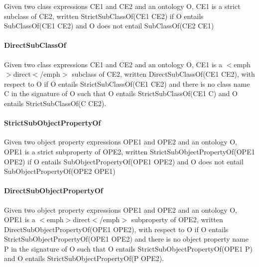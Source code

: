 Given two class expressions {\ttfamily C\-E1} and {\ttfamily C\-E2} and an ontology {\ttfamily O}, {\ttfamily C\-E1} is a strict subclass of {\ttfamily C\-E2}, written {\ttfamily Strict\-Sub\-Class\-Of(\-C\-E1 C\-E2)} if {\ttfamily O} entails {\ttfamily Sub\-Class\-Of(\-C\-E1 C\-E2)} and {\ttfamily O} does not entail {\ttfamily Sub\-Class\-Of(\-C\-E2 C\-E1)} 

\paragraph*{Direct\-Sub\-Class\-Of}

Given two class expressions {\ttfamily C\-E1} and {\ttfamily C\-E2} and an ontology {\ttfamily O}, {\ttfamily C\-E1} is a $<$emph$>$direct$<$/emph$>$ subclass of {\ttfamily C\-E2}, written {\ttfamily Direct\-Sub\-Class\-Of(\-C\-E1 C\-E2)}, with respect to {\ttfamily O} if {\ttfamily O} entails {\ttfamily Strict\-Sub\-Class\-Of(\-C\-E1 C\-E2)} and there is no class name {\ttfamily C} in the signature of {\ttfamily O} such that {\ttfamily O} entails {\ttfamily Strict\-Sub\-Class\-Of(\-C\-E1 C)} and {\ttfamily O} entails {\ttfamily Strict\-Sub\-Class\-Of(\-C C\-E2)}. 

\paragraph*{Strict\-Sub\-Object\-Property\-Of}

Given two object property expressions {\ttfamily O\-P\-E1} and {\ttfamily O\-P\-E2} and an ontology {\ttfamily O}, {\ttfamily O\-P\-E1} is a strict subproperty of {\ttfamily O\-P\-E2}, written {\ttfamily Strict\-Sub\-Object\-Property\-Of(\-O\-P\-E1 O\-P\-E2)} if {\ttfamily O} entails {\ttfamily Sub\-Object\-Property\-Of(\-O\-P\-E1 O\-P\-E2)} and {\ttfamily O} does not entail {\ttfamily Sub\-Object\-Property\-Of(\-O\-P\-E2 O\-P\-E1)} 

\paragraph*{Direct\-Sub\-Object\-Property\-Of}

Given two object property expressions {\ttfamily O\-P\-E1} and {\ttfamily O\-P\-E2} and an ontology {\ttfamily O}, {\ttfamily O\-P\-E1} is a $<$emph$>$direct$<$/emph$>$ subproperty of {\ttfamily O\-P\-E2}, written {\ttfamily Direct\-Sub\-Object\-Property\-Of(\-O\-P\-E1 O\-P\-E2)}, with respect to {\ttfamily O} if {\ttfamily O} entails {\ttfamily Strict\-Sub\-Object\-Property\-Of(\-O\-P\-E1 O\-P\-E2)} and there is no object property name {\ttfamily P} in the signature of {\ttfamily O} such that {\ttfamily O} entails {\ttfamily Strict\-Sub\-Object\-Property\-Of(\-O\-P\-E1 P)} and {\ttfamily O} entails {\ttfamily Strict\-Sub\-Object\-Property\-Of(\-P O\-P\-E2)}. 

